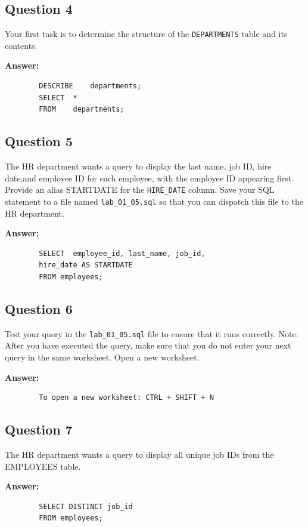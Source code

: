 \documentclass[12pt,a4paper]{article}
\begin{document}
\subsection*{Question 4}
Your first task is to determine the structure of the \texttt{DEPARTMENTS} table and its contents.

\textbf{Answer:}
    \begin{lstlisting}
        DESCRIBE    departments;
        SELECT  *
        FROM    departments;
    \end{lstlisting}

\subsection*{Question 5}
The HR department wants a query to display the last name, job ID, hire date,and employee ID 
for each employee, with the employee ID appearing first. 
Provide an alias STARTDATE for the \texttt{HIRE\_DATE} column. 
Save your SQL statement to a file named \texttt{lab\_01\_05.sql} so that you can 
dispatch this file to the HR department.

\textbf{Answer:}
    \begin{lstlisting}
        SELECT  employee_id, last_name, job_id, 
        hire_date AS STARTDATE
        FROM employees;
    \end{lstlisting}

\subsection*{Question 6}
Test your query in the \texttt{lab\_01\_05.sql} file to ensure that it runs correctly.
Note: After you have executed the query, make sure that you do not enter 
your next query in the same worksheet. Open a new worksheet.

\textbf{Answer:}
    \begin{lstlisting}
        To open a new worksheet: CTRL + SHIFT + N
    \end{lstlisting}

\subsection*{Question 7}
The HR department wants a query to display all unique job IDs from the EMPLOYEES table.

\textbf{Answer:}
    \begin{lstlisting}
        SELECT DISTINCT job_id
        FROM employees;
    \end{lstlisting}
\end{document}

